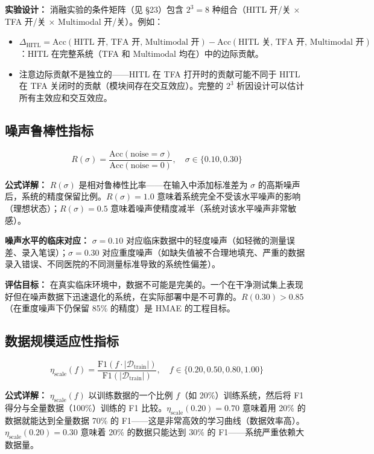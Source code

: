 \documentclass[11pt,a4paper]{ctexart}
\theoremstyle{remark}
\begin{document}
\textbf{实验设计：} 消融实验的条件矩阵（见 §23）包含 $2^3 = 8$ 种组合（HITL 开/关 × TFA 开/关 × Multimodal 开/关）。例如：
\begin{itemize}[nosep]
\item $\Delta_{\text{HITL}} = \text{Acc}(\text{HITL 开, TFA 开, Multimodal 开}) - \text{Acc}(\text{HITL 关, TFA 开, Multimodal 开})$：HITL 在完整系统（TFA 和 Multimodal 均在）中的边际贡献。
\item 注意边际贡献不是独立的——HITL 在 TFA 打开时的贡献可能不同于 HITL 在 TFA 关闭时的贡献（模块间存在交互效应）。完整的 $2^3$ 析因设计可以估计所有主效应和交互效应。
\end{itemize}

\subsection{噪声鲁棒性指标}

\begin{equation}
R(\sigma) = \frac{\text{Acc}(\text{noise} = \sigma)}{\text{Acc}(\text{noise} = 0)}, \quad \sigma \in \{0.10, 0.30\}
\end{equation}

\textbf{公式详解：} $R(\sigma)$ 是相对鲁棒性比率——在输入中添加标准差为 $\sigma$ 的高斯噪声后，系统的精度保留比例。$R(\sigma) = 1.0$ 意味着系统完全不受该水平噪声的影响（理想状态）；$R(\sigma) = 0.5$ 意味着噪声使精度减半（系统对该水平噪声非常敏感）。

\textbf{噪声水平的临床对应：} $\sigma = 0.10$ 对应临床数据中的轻度噪声（如轻微的测量误差、录入笔误）；$\sigma = 0.30$ 对应重度噪声（如缺失值被不合理地填充、严重的数据录入错误、不同医院的不同测量标准导致的系统性偏差）。

\textbf{评估目标：} 在真实临床环境中，数据不可能是完美的。一个在干净测试集上表现好但在噪声数据下迅速退化的系统，在实际部署中是不可靠的。$R(0.30) > 0.85$（在重度噪声下仍保留 85\% 的精度）是 HMAE 的工程目标。

\subsection{数据规模适应性指标}

\begin{equation}
\eta_{\text{scale}}(f) = \frac{\text{F1}(f \cdot |\mathcal{D}_{\text{train}}|)}{\text{F1}(|\mathcal{D}_{\text{train}}|)}, \quad f \in \{0.20, 0.50, 0.80, 1.00\}
\end{equation}

\textbf{公式详解：} $\eta_{\text{scale}}(f)$ 以训练数据的一个比例 $f$（如 20\%）训练系统，然后将 F1 得分与全量数据（100\%）训练的 F1 比较。$\eta_{\text{scale}}(0.20) = 0.70$ 意味着用 20\% 的数据就能达到全量数据 70\% 的 F1——这是非常高效的学习曲线（数据效率高）。$\eta_{\text{scale}}(0.20) = 0.30$ 意味着 20\% 的数据只能达到 30\% 的 F1——系统严重依赖大数据量。
\end{document}
